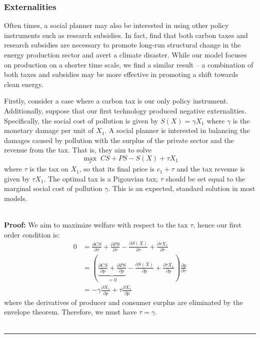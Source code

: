 \documentclass[11pt,a4paper]{extarticle}
\newenvironment{proof}[1][Proof]{\noindent\textbf{#1:} }{\ \rule{0.5em}{0.5em}}
\begin{document}
\subsubsection{Externalities}


Often times, a social planner may also be interested in using other policy instruments such as research subsidies. In fact, \citet{Ace2012} find that both carbon taxes and research subsidies are necessary to promote long-run structural change in the energy production sector and avert a climate disaster. While our model focuses on production on a shorter time scale, we find a similar result -- a combination of both taxes and subsidies may be more effective in promoting a shift towards clean energy. 


Firstly, consider a case where a carbon tax is our only policy instrument. Additionally, suppose that our first technology produced negative externalities. Specifically, the social cost of pollution is given by $S(X) = \gamma X_1$ where $\gamma$ is the monetary damage per unit of $X_1$. A social planner is interested in balancing the damages caused by pollution with the surplus of the private sector and the revenue from the tax. That is, they aim to solve
$$\max_{\tau} \; CS + PS - S(X) + \tau X_1$$
where $\tau$ is the tax on $X_1$, so that its final price is $c_1 + \tau$ and the tax revenue is given by $\tau X_1$. The optimal tax is a Pigouvian tax; $\tau$ should be set equal to the marginal social cost of pollution $\gamma$. This is an expected, standard solution in most models.


\hfill \\
\begin{proof} We aim to maximize welfare with respect to the tax $\tau$, hence our first order condition is:
	\begin{align*}
	0 &= \frac{\partial CS}{\partial \tau} + \frac{\partial PS}{\partial \tau} - \frac{\partial S(X)}{\partial \tau} + \frac{\partial \tau X_1}{\partial \tau} \\
	&=  \left( \underbrace{\frac{\partial CS}{\partial p}  + \frac{\partial PS}{\partial p}}_{= 0} - \frac{ \partial  S(X)}{\partial p} + \frac{\partial \tau X_1}{\partial p} \right) \frac{\partial p}{\partial \tau} \\
	&=  - \gamma \frac{\partial  X_1}{\partial p} + \tau \frac{\partial  X_1}{\partial p}
	\end{align*}
	where the derivatives of producer and consumer surplus are eliminated by the envelope theorem. Therefore, we must have $\tau = \gamma$. \\
	\hfill
\end{proof}
\end{document}
